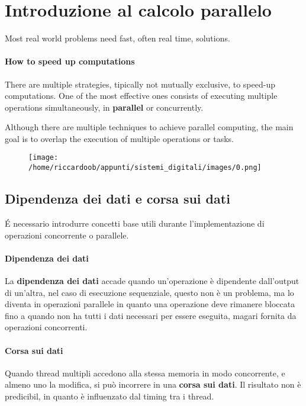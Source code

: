 \chapter{Introduzione al calcolo parallelo}

Most real world problems need fast, often real time, solutions.

\subsubsection{How to speed up computations}
There are multiple strategies, tipically not mutually exclusive, to speed-up computations.
One of the most effective ones consists of executing multiple operations simultaneously, in \textbf{parallel} or concurrently.

Although there are multiple techniques to achieve parallel computing, the main goal is to overlap the execution of multiple operations or tasks.

\begin{figure}[H]
    \centering
    \texttt{[image: /home/riccardoob/appunti/sistemi\_digitali/images/0.png]}
\end{figure}

\section{Dipendenza dei dati e corsa sui dati}

É necessario introdurre concetti base utili durante l'implementazione di operazioni concorrente o parallele.

\subsubsection{Dipendenza dei dati}

La \textbf{dipendenza dei dati}  accade quando un'operazione è dipendente dall'output di un'altra, nel caso di esecuzione sequenziale, questo non è un problema, ma lo diventa in operazioni parallele in quanto una operazione deve rimanere bloccata fino a quando non ha tutti i dati necessari per essere eseguita, magari fornita da operazioni concorrenti.


\subsubsection{Corsa sui dati}

Quando thread multipli accedono alla stessa memoria in modo concorrente, e almeno uno la modifica, si può incorrere in una \textbf{corsa sui dati}. Il risultato non è predicibil, in quanto è influenzato dal timing tra i thread.

